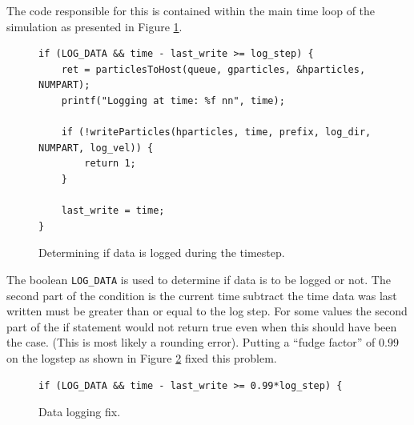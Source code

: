 \documentclass[../Interim_Report_Master]{subfiles}
\begin{document}
The code responsible for this is contained within the main time loop of the simulation as presented in Figure \ref{code:log_loop}.
\begin{figure}[h]
\begin{lstlisting}[frame=single, style=cstyle]
if (LOG_DATA && time - last_write >= log_step) {
	ret = particlesToHost(queue, gparticles, &hparticles, NUMPART);
	printf("Logging at time: %f nn", time);

	if (!writeParticles(hparticles, time, prefix, log_dir, NUMPART, log_vel)) {
		return 1;
	}
	
	last_write = time;
}
\end{lstlisting}
\caption{Determining if data is logged during the timestep.}
\label{code:log_loop}
\end{figure}

The boolean \lstinline[style=cstyleintext]|LOG_DATA| is used to determine if data is to be logged or not. The second part of the condition is the current time subtract the time data was last written must be greater than or equal to the log step. For some values the second part of the if statement would not return true even when this should have been the case. (This is most likely a rounding error). Putting a ``fudge factor'' of $0.99$ on the logstep as shown in Figure \ref{code:log_data_fix} fixed this problem.
\begin{figure}[h]
\begin{lstlisting}[frame=single, style=cstyle]
if (LOG_DATA && time - last_write >= 0.99*log_step) {
\end{lstlisting}
\caption{Data logging fix.}
\label{code:log_data_fix}
\end{figure}
\end{document}
